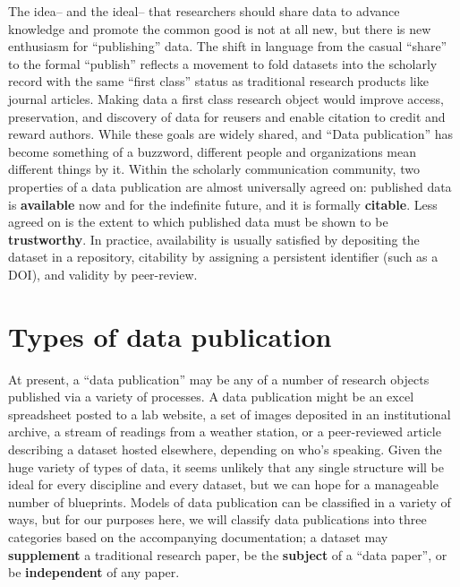 \documentclass[10pt,a4paper,twocolumn]{article}
\begin{document}
The idea– and the ideal– that researchers should share data to advance knowledge and promote the common good is not at all new, but there is new enthusiasm for ``publishing'' data.
The shift in language from the casual ``share'' to the formal ``publish'' reflects a movement to fold datasets into the scholarly record with the same ``first class'' status as traditional research products like journal articles.  
Making data a first class research object would improve access, preservation, and discovery of data for reusers and enable citation to credit and reward authors.
While these goals are widely shared, and ``Data publication'' has become something of a buzzword, different people and organizations mean different things by it.
Within the scholarly communication community, two properties of a data publication are almost universally agreed on: published data is \textbf{available} now and for the indefinite future, and it is formally \textbf{citable}. 
Less agreed on is the extent to which published data must be shown to be \textbf{trustworthy}.
In practice, availability is usually satisfied by depositing the dataset in a repository, citability by assigning a persistent identifier (such as a DOI), and validity by peer-review.


\section*{Types of data publication}\label{types-of-data-publication}

At present, a ``data publication'' may be any of a number of research objects published via a variety of processes.
A data publication might be an excel spreadsheet posted to a lab website, a set of images deposited in an institutional archive, a stream of readings from a weather station, or a peer-reviewed article describing a dataset hosted elsewhere, depending on who's speaking.
Given the huge variety of types of data, it seems unlikely that any single structure will be ideal for every discipline and every dataset, but we can hope for a manageable number of blueprints. 
Models of data publication can be classified in a variety of ways, but for our purposes here, we will classify data publications into three categories based on the accompanying documentation; a dataset may \textbf{supplement} a traditional research paper, be the \textbf{subject} of a ``data paper'', or be \textbf{independent} of any paper.
\end{document}
